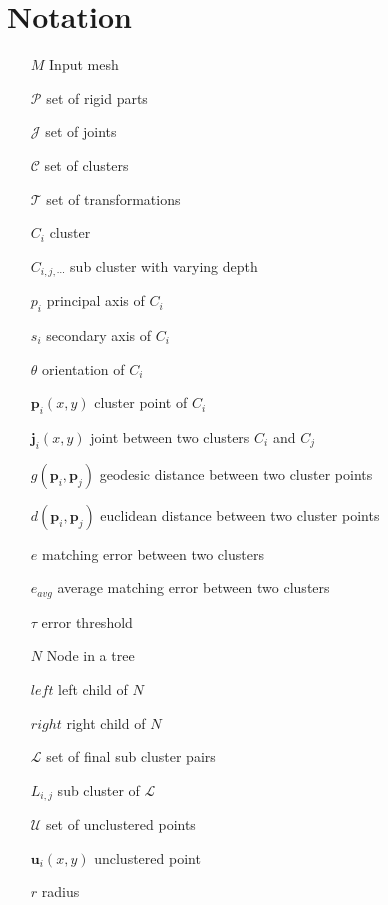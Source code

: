 \chapter{Notation}
\label{cha:Notation}

\begin{itemize}
	\item[$M$] Input mesh
	\item[$\mathcal{P}$] set of rigid parts
	\item[$\mathcal{J}$] set of joints
	\item[$\mathcal{C}$] set of clusters
	\item[$\mathcal{T}$] set of transformations
	\item[$C_i$] cluster
	\item[$C_{i,j,\cdots}$] sub cluster with varying depth
	\item[$p_i$] principal axis of $C_i$
	\item[$s_i$] secondary axis of $C_i$
	\item[$\theta$] orientation of $C_i$
	\item[$\boldsymbol{p}_i(x,y)$] cluster point of $C_i$
	\item[$\boldsymbol{j}_i(x,y)$] joint between two clusters $C_i$ and $C_j$
	\item[$g(\boldsymbol{p}_i,\boldsymbol{p}_j)$] geodesic distance between two cluster points
	\item[$d(\boldsymbol{p}_i,\boldsymbol{p}_j)$] euclidean distance between two cluster points
	\item[$e$] matching error between two clusters
	\item[$e_{avg}$] average matching error between two clusters 
	\item[$\tau$] error threshold 
	\item[$N$] Node in a tree
	\item[$\mathit{left}$] left child of $N$
	\item[$\mathit{right}$] right child of $N$
	\item[$\mathcal{L}$] set of final sub cluster pairs
	\item[$L_{i,j}$] sub cluster of $\mathcal{L}$	
	\item[$\mathcal{U}$] set of unclustered points
	\item[$\boldsymbol{u}_i(x,y)$] unclustered point
	\item[$r$] radius
\end{itemize}


